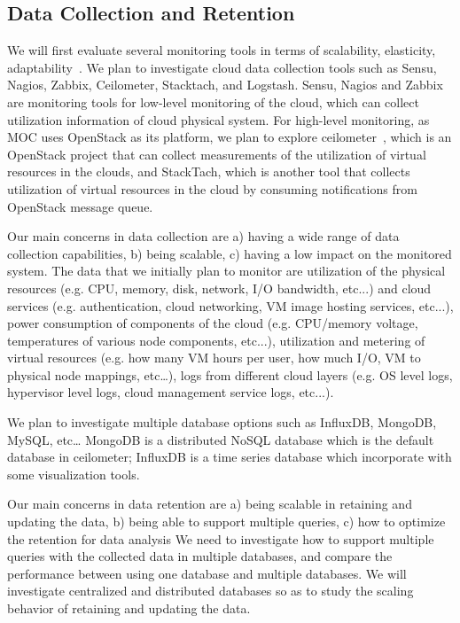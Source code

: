 \subsection{Data Collection and Retention}

We will first evaluate several monitoring tools in terms of scalability, elasticity, adaptability~\cite{Aceto2013}. We plan to investigate cloud data collection tools such as Sensu, Nagios, Zabbix, Ceilometer, Stacktach, and Logstash. Sensu, Nagios and Zabbix are monitoring tools for low-level monitoring of the cloud, which can collect utilization information of cloud physical system. For high-level monitoring, as MOC uses OpenStack as its platform, we plan to explore ceilometer~\cite{ceilometer}, which is an OpenStack project that can collect measurements of the utilization of virtual resources in the clouds, and StackTach, which is another tool that collects utilization of virtual resources in the cloud by  consuming notifications from OpenStack message queue. 

Our main concerns in data collection are a) having a wide range of data collection capabilities, b) being scalable, c) having a low impact on the monitored system. The data that we initially plan to monitor are utilization of the physical resources (e.g. CPU, memory, disk, network, I/O bandwidth, etc...) and cloud services (e.g. authentication, cloud networking, VM image hosting services, etc...), power consumption of components of the cloud (e.g. CPU/memory voltage, temperatures of various node components, etc...), utilization and metering of virtual resources (e.g. how many VM hours per user, how much I/O, VM to physical node mappings, etc…), logs from different cloud layers (e.g. OS level logs, hypervisor level logs, cloud management service logs, etc...). 

We plan to investigate multiple database options such as InfluxDB, MongoDB, MySQL, etc… MongoDB is a distributed NoSQL database which is the default database in ceilometer; InfluxDB is a time series database which incorporate with some visualization tools. 

Our main concerns in data retention are a) being scalable in retaining and updating the data, b) being able to support multiple queries, c) how to optimize the retention for data analysis
We need to investigate how to support multiple queries with the collected data in multiple databases, and compare the performance between using one database and multiple databases. We will investigate centralized and distributed databases so as to study the scaling behavior of retaining and updating the data. 
